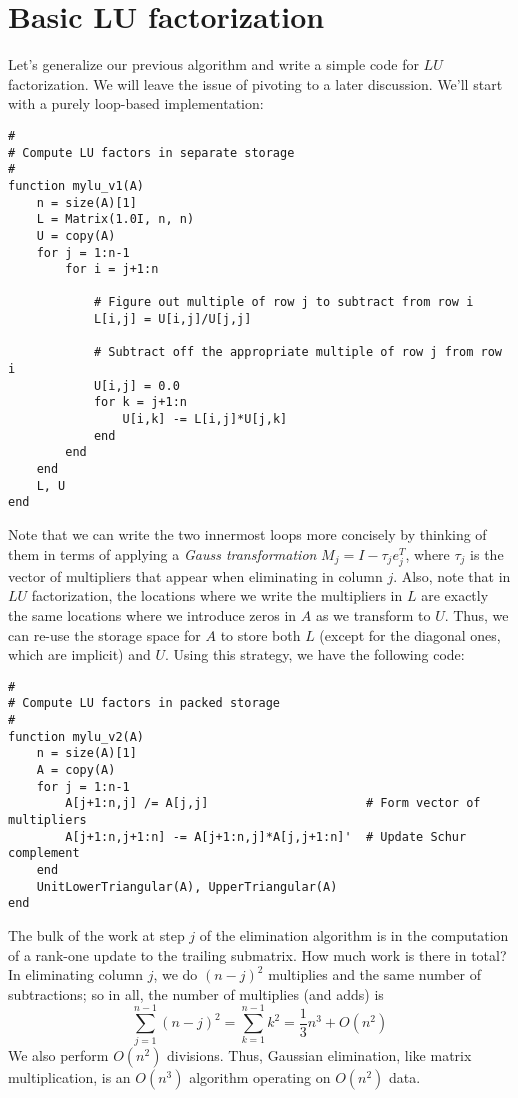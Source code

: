 \documentclass[12pt, leqno]{article} %
\begin{document}
\section{Basic LU factorization}

Let's generalize our previous algorithm and write a simple code for
$LU$ factorization.  We will leave the issue of pivoting to a later
discussion.  We'll start with a purely loop-based implementation:
\begin{lstlisting}
#
# Compute LU factors in separate storage
#
function mylu_v1(A)
    n = size(A)[1]
    L = Matrix(1.0I, n, n)
    U = copy(A)
    for j = 1:n-1
        for i = j+1:n

            # Figure out multiple of row j to subtract from row i
            L[i,j] = U[i,j]/U[j,j]

            # Subtract off the appropriate multiple of row j from row i
            U[i,j] = 0.0
            for k = j+1:n
                U[i,k] -= L[i,j]*U[j,k]
            end
        end
    end
    L, U
end
\end{lstlisting}
Note that we can write the two innermost loops more concisely by
thinking of them in terms of applying a {\em Gauss
  transformation} $M_j = I - \tau_j e_j^T$, where $\tau_j$ is the
vector of multipliers that appear when eliminating in column $j$.
Also, note that in $LU$ factorization, the locations where we write the multipliers in
$L$ are exactly the same locations where we introduce zeros in $A$ as we
transform to $U$.  Thus, we can re-use the storage space for $A$ to
store both $L$ (except for the diagonal ones, which are implicit) and
$U$.  Using this strategy, we have the following code:
\begin{lstlisting}
#
# Compute LU factors in packed storage
#
function mylu_v2(A)
    n = size(A)[1]
    A = copy(A)
    for j = 1:n-1
        A[j+1:n,j] /= A[j,j]                      # Form vector of multipliers
        A[j+1:n,j+1:n] -= A[j+1:n,j]*A[j,j+1:n]'  # Update Schur complement
    end
    UnitLowerTriangular(A), UpperTriangular(A)
end
\end{lstlisting}

The bulk of the work at step $j$ of the elimination algorithm is in
the computation of a rank-one update to the trailing submatrix.
How much work is there in total?  In eliminating column $j$, we do
$(n-j)^2$ multiplies and the same number of subtractions; so in all,
the number of multiplies (and adds) is
\[
  \sum_{j=1}^{n-1} (n-j)^2 = \sum_{k=1}^{n-1} k^2 = \frac{1}{3} n^3 + O(n^2)
\]
We also perform $O(n^2)$ divisions.  Thus, Gaussian elimination, like
matrix multiplication, is an $O(n^3)$ algorithm operating on $O(n^2)$ data.
\end{document}

